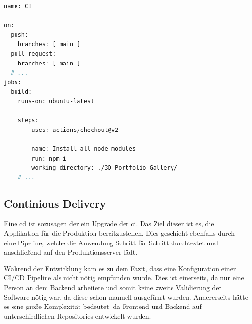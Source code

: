 \begin{lstlisting}[label=lst:cipipeline, language=bash, caption=Pipeline einer CI]
name: CI

on:
  push:
    branches: [ main ]
  pull_request:
    branches: [ main ]
  # ...
jobs:
  build:
    runs-on: ubuntu-latest

    steps:
      - uses: actions/checkout@v2

      - name: Install all node modules
        run: npm i 
        working-directory: ./3D-Portfolio-Gallery/
    # ...

\end{lstlisting}

\subsection{Continious Delivery}

Eine \gls{cd} ist sozusagen der ein Upgrade der \gls{ci}. 
Das Ziel dieser ist es, die Applikation für die Produktion bereitzustellen. 
Dies geschieht ebenfalls durch eine Pipeline, welche die Anwendung Schritt für Schritt durchtestet und anschließend auf den Produktionsserver lädt. 
\cite{cicdabout}

Während der Entwicklung kam es zu dem Fazit, dass eine Konfiguration einer CI/CD Pipeline als nicht nötig empfunden wurde. 
Dies ist einerseits, da nur eine Person an dem Backend arbeitete und somit keine zweite Validierung der Software nötig war, da diese schon manuell ausgeführt wurden. 
Andererseits hätte es eine große Komplexität bedeutet, da Frontend und Backend auf unterschiedlichen Repositories entwickelt wurden. 
 